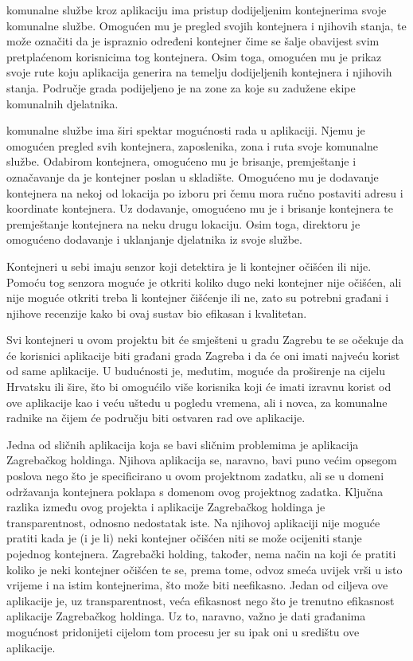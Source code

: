 		 komunalne službe kroz aplikaciju ima pristup dodijeljenim kontejnerima svoje komunalne službe.
		Omogućen mu je pregled svojih kontejnera i njihovih stanja, te može označiti da je ispraznio određeni kontejner čime se šalje obavijest svim pretplaćenom korisnicima tog kontejnera. 
		Osim toga, omogućen mu je prikaz svoje rute koju aplikacija generira na temelju dodijeljenih kontejnera i njihovih stanja. Područje grada podijeljeno je na zone za koje su zadužene ekipe komunalnih djelatnika. 
		
		 komunalne službe ima širi spektar mogućnosti rada u aplikaciji. 
		Njemu je omogućen pregled svih kontejnera, zaposlenika, zona i ruta svoje komunalne službe. 
		Odabirom kontejnera, omogućeno mu je brisanje, premještanje i označavanje da je kontejner poslan u skladište.
		Omogućeno mu je dodavanje kontejnera na nekoj od lokacija po izboru pri čemu mora ručno postaviti adresu i koordinate kontejnera. Uz dodavanje, omogućeno mu je i brisanje kontejnera te premještanje kontejnera na neku drugu lokaciju.
		Osim toga, direktoru je omogućeno dodavanje i uklanjanje djelatnika iz svoje službe.
		
		Kontejneri u sebi imaju senzor koji detektira je li kontejner očišćen ili nije. Pomoću tog senzora moguće je otkriti koliko dugo neki kontejner nije očišćen, ali nije moguće otkriti treba li kontejner čišćenje ili ne, zato su potrebni građani i njihove recenzije kako bi ovaj sustav bio efikasan i kvalitetan.
		
		Svi kontejneri u ovom projektu bit će smješteni u gradu Zagrebu te se očekuje da će korisnici aplikacije biti građani grada Zagreba i da će oni imati najveću korist od same aplikacije. U budućnosti je, međutim, moguće da proširenje na cijelu Hrvatsku ili šire, što bi omogućilo više korisnika koji će imati izravnu korist od ove aplikacije kao i veću uštedu u pogledu vremena, ali i novca, za komunalne radnike na čijem će području biti ostvaren rad ove aplikacije.
		
		Jedna od sličnih aplikacija koja se bavi sličnim problemima je aplikacija Zagrebačkog holdinga. Njihova aplikacija se, naravno, bavi puno većim opsegom poslova nego što je specificirano u ovom projektnom zadatku, ali se u domeni održavanja kontejnera poklapa s domenom ovog projektnog zadatka. Ključna razlika između ovog projekta i aplikacije Zagrebačkog holdinga je transparentnost, odnosno nedostatak iste. Na njihovoj aplikaciji nije moguće pratiti kada je (i je li) neki kontejner očišćen niti se može ocijeniti stanje pojednog kontejnera. Zagrebački holding, također, nema način na koji će pratiti koliko je neki kontejner očišćen te se, prema tome, odvoz smeća uvijek vrši u isto vrijeme i na istim kontejnerima, što može biti neefikasno. Jedan od ciljeva ove aplikacije je, uz transparentnost, veća efikasnost nego što je trenutno efikasnost aplikacije Zagrebačkog holdinga. Uz to, naravno, važno je dati građanima mogućnost pridonijeti cijelom tom procesu jer su ipak oni u središtu ove aplikacije. 
		
